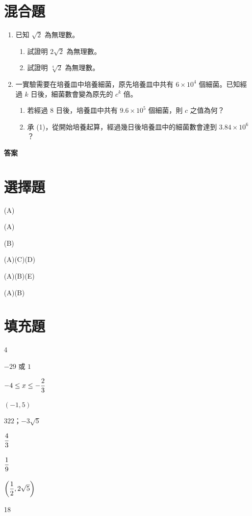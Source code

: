 \documentclass[12pt]{article}
\newcommand*{\fraction}[2]{\rule[-.8\baselineskip]{0pt}{2\baselineskip}\dfrac{#1}{#2}}
\begin{document}
\section{混合題}
\begin{enumerate}[align=left,leftmargin=*,labelsep=.6em,parsep=0ex]
  \item 已知 $\sqrt{2}$ 為無理數。
  \begin{enumerate}[label=(\arabic*),align=left,leftmargin=*,labelsep=.4em]
    \item 試證明 $2\sqrt{2}$ 為無理數。
    \item 試證明 $\sqrt[4]{2}$ 為無理數。
  \end{enumerate}
  \item 一實驗需要在培養皿中培養細菌，原先培養皿中共有 $6 \times 10^4$ 個細菌。已知經過 $k$ 日後，細菌數會變為原先的 $c^k$ 倍。
  \begin{enumerate}[label=(\arabic*),align=left,leftmargin=*,labelsep=.4em]
    \item 若經過 8 日後，培養皿中共有 $9.6 \times 10^5$ 個細菌，則 $c$ 之值為何？
    \item 承 (1)，從開始培養起算，經過幾日後培養皿中的細菌數會達到 $3.84 \times 10^6$？
  \end{enumerate}
\end{enumerate}

\newpage
{\bfseries\large 答案 \par}
\section*{選擇題}
\begin{enumerate*}[label=\arabic*.,itemjoin=\tab]
  \item (A)
  \item (A)
  \item (B)
  \item (A)(C)(D)
  \item (A)(B)(E)
  \item (A)(B)
\end{enumerate*}
\section*{填充題}
\begin{enumerate*}[label=\Alph*.,itemjoin=\tab]
  \item 4
  \item $-29$ 或 $1$
  \item $-4 \leq x \leq -\fraction{2}{3}$
  \item $(-1,5)$
  \item $322$；$-3\sqrt{5}$
  \item $\fraction{4}{3}$
  \item $\fraction{1}{9}$
  \item $\biggl(\fraction{1}{2}, 2\sqrt{5}\biggr)$
  \item 18
\end{enumerate*}
\end{document}
